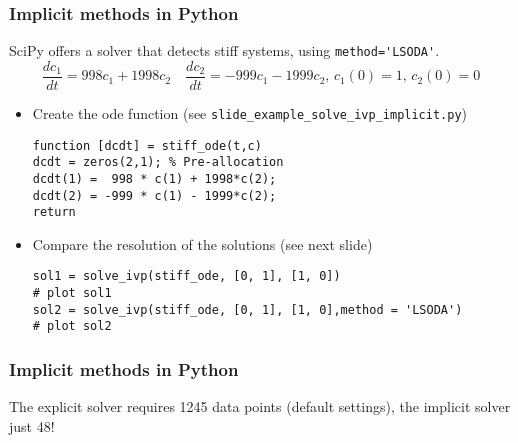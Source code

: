\begin{frame}[fragile]
  \frametitle{Implicit methods in Python}
  SciPy offers a solver that detects stiff systems, using \lstinline$method='LSODA'$. 
  \[
    \frac{dc_1}{dt} = 998c_1 + 1998c_2 \quad 
    \frac{dc_2}{dt} = -999c_1 -1999c_2,\, c_1(0) = 1,\, c_2(0) = 0
  \]%
  \begin{itemize}
    \item Create the ode function (see \lstinline$slide_example_solve_ivp_implicit.py$)
    \begin{lstlisting}
function [dcdt] = stiff_ode(t,c)
dcdt = zeros(2,1); % Pre-allocation
dcdt(1) =  998 * c(1) + 1998*c(2);
dcdt(2) = -999 * c(1) - 1999*c(2);
return
    \end{lstlisting}
  \item Compare the resolution of the solutions (see next slide)
    \begin{lstlisting}
sol1 = solve_ivp(stiff_ode, [0, 1], [1, 0])
# plot sol1
sol2 = solve_ivp(stiff_ode, [0, 1], [1, 0],method = 'LSODA')
# plot sol2
    \end{lstlisting}
  \end{itemize}
\end{frame}

{\nologo
\begin{frame}[fragile]
\frametitle{Implicit methods in Python}
\begin{center}
\end{center}
The explicit solver requires 1245 data points (default settings), the implicit solver just 48!
\end{frame}
}

